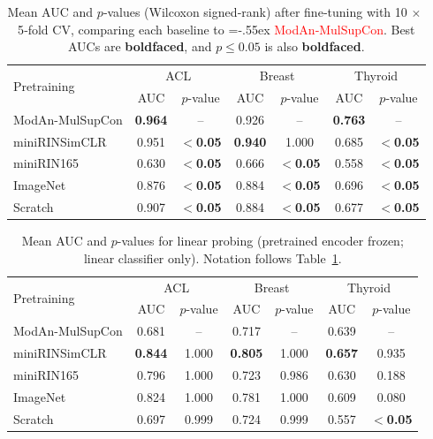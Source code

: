 \documentclass[final,1p,times]{elsarticle}
\newcommand{\revadd}[1]{\textcolor{red}{#1}}
\DeclareRobustCommand{\revdel}[1]{%
  {\begingroup
   \color{red}%
   \ULdepth=-.55ex%
   \uuline{#1}%
   \endgroup}%
}
\begin{document}
\begin{table}[t]
  \centering
  \caption{Mean AUC and $p$‑values (Wilcoxon signed‑rank) after fine‑tuning with 10$\,\times\,$5‑fold CV, comparing each baseline to \revdel{the proposed SSL}\revadd{ModAn‑MulSupCon}.
  Best AUCs are \textbf{boldfaced},
  and $p\le 0.05$ is also \textbf{boldfaced}.}
  \label{tab:finetune_auc}
  \begin{tabular}{lcccccc}
    \toprule
    \multirow{2}{*}{Pretraining} &
      \multicolumn{2}{c}{ACL} &
      \multicolumn{2}{c}{Breast} &
      \multicolumn{2}{c}{Thyroid}\\
    & AUC & $p$-value & AUC & $p$-value & AUC & $p$-value\\
    \midrule
    ModAn-MulSupCon & {\bf 0.964} & -- & 0.926 & -- & {\bf 0.763} & --\\
    miniRINSimCLR       & 0.951 & {\bf$<$0.05} & {\bf0.940} & 1.000 & 0.685 & {\bf$<$0.05}\\
    miniRIN165  & 0.630 & {\bf$<$0.05} & 0.666 & {\bf$<$0.05} & 0.558 & {\bf$<$0.05}\\
    ImageNet     & 0.876 & {\bf$<$0.05} & 0.884 & {\bf$<$0.05} & 0.696 & {\bf$<$0.05}\\
    Scratch      & 0.907 & {\bf$<$0.05} & 0.884 & {\bf$<$0.05} & 0.677 & {\bf$<$0.05}\\

    \bottomrule
  \end{tabular}
\end{table}

\begin{table}[t]
  \centering
  \caption{Mean AUC and $p$-values for linear probing (pretrained encoder frozen; linear classifier only). Notation follows Table~\ref{tab:finetune_auc}.}
  \label{tab:lp_auc}
  \begin{tabular}{lcccccc}
    \toprule
    \multirow{2}{*}{Pretraining} &
      \multicolumn{2}{c}{ACL} &
      \multicolumn{2}{c}{Breast} &
      \multicolumn{2}{c}{Thyroid}\\
    & AUC & $p$-value & AUC & $p$-value & AUC & $p$-value\\
    \midrule
    ModAn-MulSupCon & 0.681 & -- & 0.717 & -- & 0.639 & --\\
    miniRINSimCLR       & {\bf0.844} & 1.000 & {\bf0.805} & 1.000 & {\bf0.657} & 0.935\\
    miniRIN165  & 0.796 & 1.000 & 0.723 & 0.986 & 0.630 & 0.188\\
    ImageNet     & 0.824 & 1.000 & 0.781 & 1.000 & 0.609 & 0.080\\
    Scratch      & 0.697 & 0.999 & 0.724 & 0.999 & 0.557 & {\bf$<$0.05}\\

    \bottomrule
  \end{tabular}
\end{table}
\end{document}
